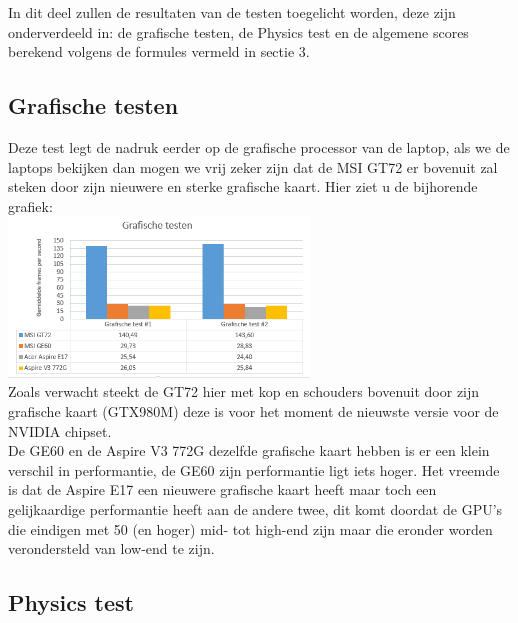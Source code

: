 In dit deel zullen de resultaten van de testen toegelicht worden, deze zijn onderverdeeld in: de grafische testen, de Physics test en de algemene scores berekend volgens de formules vermeld in sectie 3.

\subsection{Grafische testen}

Deze test legt de nadruk eerder op de grafische processor van de laptop, als we de laptops bekijken dan mogen we vrij zeker zijn dat de MSI GT72 er bovenuit zal steken door zijn nieuwere en sterke grafische kaart. Hier ziet u de bijhorende grafiek: \\
\includegraphics[width=8cm]{grafische}\\
Zoals verwacht steekt de GT72 hier met kop en schouders bovenuit door zijn grafische kaart (GTX980M) deze is voor het moment de nieuwste versie voor de NVIDIA chipset.\\
De GE60 en de Aspire V3 772G dezelfde grafische kaart hebben is er een klein verschil in performantie, de GE60 zijn performantie ligt iets hoger.
Het vreemde is dat de Aspire E17 een nieuwere grafische kaart heeft maar toch een gelijkaardige performantie heeft aan de andere twee, dit komt doordat de GPU's die eindigen met 50 (en hoger) mid- tot high-end zijn maar die eronder worden verondersteld van low-end te zijn.

\subsection{Physics test}

